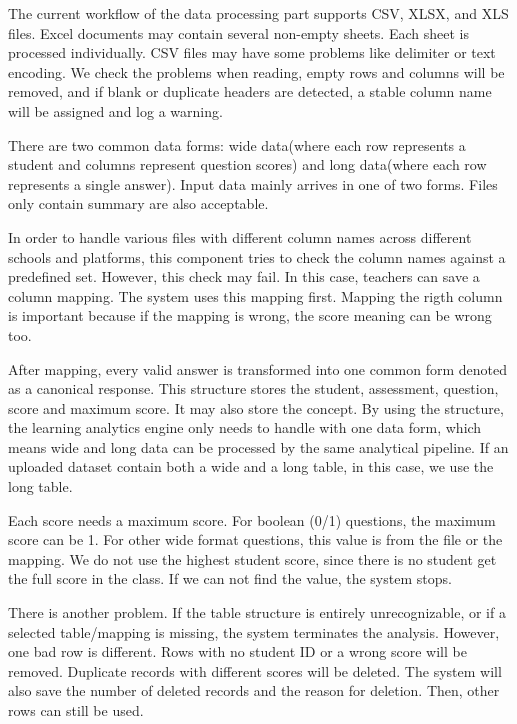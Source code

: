 \documentclass[11pt,a4paper]{article}
\begin{document}

The current workflow of the data processing part supports CSV, XLSX, and XLS files. Excel documents may contain several non-empty sheets. Each sheet is processed individually. CSV files may have some problems like delimiter or text encoding. We check the problems when reading, empty rows and columns will be removed, and if blank or duplicate headers are detected, a stable column name will be assigned and log a warning.\par

There are two common data forms: wide data(where each row represents a student and columns represent question scores) and long data(where each row represents a single answer). Input data mainly arrives in one of two forms. Files only contain summary are also acceptable.\par

In order to handle various files with different column names across different schools and platforms, this component tries to check the column names against a predefined set. However, this check may fail. In this case, teachers can save a column mapping. The system uses this mapping first. Mapping the rigth column is important because if the mapping is wrong, the score meaning can be wrong too.\par

After mapping, every valid answer is transformed into one common form denoted as a canonical response. This structure stores the student, assessment, question, score and maximum score. It may also store the concept. By using the structure, the learning analytics engine only needs to handle with one data form, which means wide and long data can be processed by the same analytical pipeline. If an uploaded dataset contain both a wide and a long table, in this case, we use the long table.\par

Each score needs a maximum score. For boolean (0/1) questions, the maximum score can be 1. For other wide format questions, this value is from the file or the mapping. We do not use the highest student score, since there is no student get the full score in the class. If we can not find the value, the system stops.

There is another problem. If the table structure is entirely unrecognizable, or if a selected table/mapping is missing, the system terminates the analysis. However, one bad row is different. Rows with no student ID or a wrong score will be removed. Duplicate records with different scores will be deleted. The system will also save the number of deleted records and the reason for deletion. Then, other rows can still be used.\par 
\end{document}
